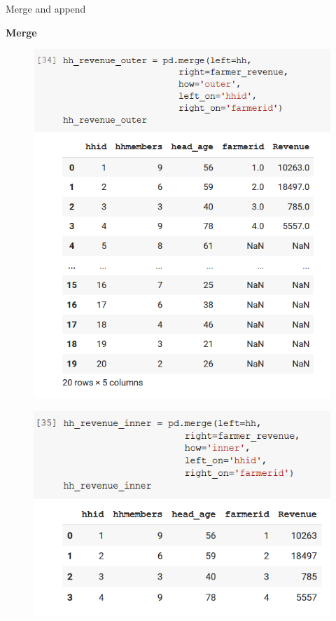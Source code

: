 \documentclass[aspectratio=169]{beamer}
\begin{document}
\begin{frame}{Merge and append}

	\textbf{Merge}

	\begin{multicols}{2}

		\begin{figure}
			\centering
			\includegraphics[width=0.85\linewidth]{img/outer_merge.png}
		\end{figure}
		\begin{figure}
			\centering
			\includegraphics[width=0.85\linewidth]{img/inner_merge.png}
		\end{figure}

	\end{multicols}

\end{frame}
\end{document}
